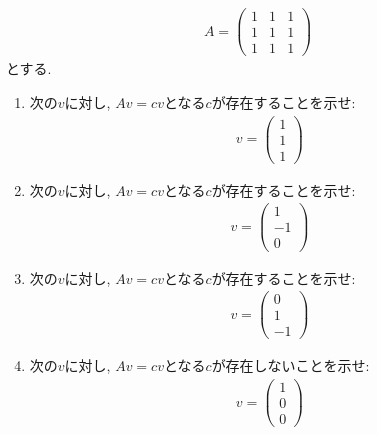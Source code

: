 \section{}
\begin{quiz}
  \begin{align*}
    A=
    \begin{pmatrix}
      1&1&1\\
      1&1&1\\
      1&1&1
    \end{pmatrix}
  \end{align*}
  とする.
  \begin{enumerate}
  \item 次の$v$に対し, $Av=cv$となる$c$が存在することを示せ:
    \begin{align*}
      v=\begin{pmatrix}1\\1\\1\end{pmatrix}
    \end{align*}
  \item 次の$v$に対し, $Av=cv$となる$c$が存在することを示せ:
    \begin{align*}
      v=\begin{pmatrix}1\\-1\\0\end{pmatrix}
    \end{align*}
  \item 次の$v$に対し, $Av=cv$となる$c$が存在することを示せ:
    \begin{align*}
      v=\begin{pmatrix}0\\1\\-1\end{pmatrix}
    \end{align*}
  \item 次の$v$に対し, $Av=cv$となる$c$が存在しないことを示せ:
    \begin{align*}
      v=\begin{pmatrix}1\\0\\0\end{pmatrix}
    \end{align*}
  \end{enumerate}
\end{quiz}

